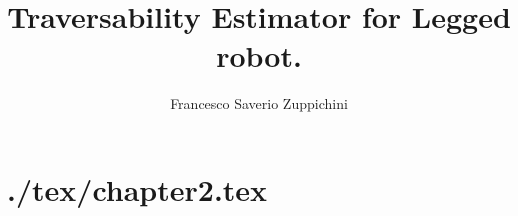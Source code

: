\documentclass[mscthesis]{usiinfthesis}
\title{Traversability Estimator for Legged robot.} %
\author{Francesco Saverio Zuppichini} %
\begin{document}
\maketitle %

\frontmatter %



\tableofcontents 

\mainmatter

% 
% 
% 
% 
% 
% 




\chapter{./tex/chapter2.tex}






\printbibliography
% 
% 
\end{document}
